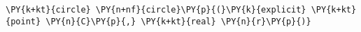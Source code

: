 \begin{Verbatim}[commandchars=\\\{\}]
    \PY{k+kt}{circle} \PY{n+nf}{circle}\PY{p}{(}\PY{k}{explicit} \PY{k+kt}{point} \PY{n}{C}\PY{p}{,} \PY{k+kt}{real} \PY{n}{r}\PY{p}{)}
\end{Verbatim}
